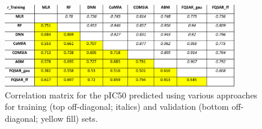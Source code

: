 \begin{figure}
  \centering
  \includegraphics[width=0.9\textwidth]{Images/bace_table_4.png}
  \caption{Correlation matrix for the pIC50 predicted using various approaches for training (top off-diagonal; italics) and validation (bottom off-diagonal; yellow fill) sets.}
  \label{fig:bace_table4}
\end{figure}



